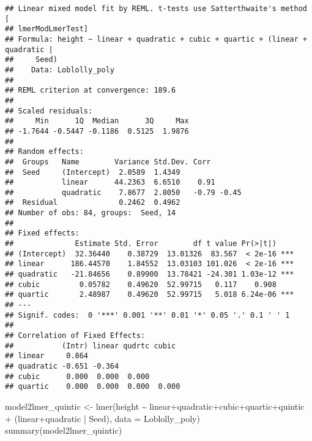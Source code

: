 \documentclass[
]{book}
\newenvironment{Shaded}{\begin{snugshade}}{\end{snugshade}}
\newcommand{\AttributeTok}[1]{\textcolor[rgb]{0.77,0.63,0.00}{#1}}
\newcommand{\FunctionTok}[1]{\textcolor[rgb]{0.00,0.00,0.00}{#1}}
\newcommand{\NormalTok}[1]{#1}
\newcommand{\OtherTok}[1]{\textcolor[rgb]{0.56,0.35,0.01}{#1}}
\newcommand{\SpecialCharTok}[1]{\textcolor[rgb]{0.00,0.00,0.00}{#1}}
\begin{document}
\begin{verbatim}
## Linear mixed model fit by REML. t-tests use Satterthwaite's method [
## lmerModLmerTest]
## Formula: height ~ linear + quadratic + cubic + quartic + (linear + quadratic |  
##     Seed)
##    Data: Loblolly_poly
## 
## REML criterion at convergence: 189.6
## 
## Scaled residuals: 
##     Min      1Q  Median      3Q     Max 
## -1.7644 -0.5447 -0.1186  0.5125  1.9876 
## 
## Random effects:
##  Groups   Name        Variance Std.Dev. Corr       
##  Seed     (Intercept)  2.0589  1.4349              
##           linear      44.2363  6.6510    0.91      
##           quadratic    7.8677  2.8050   -0.79 -0.45
##  Residual              0.2462  0.4962              
## Number of obs: 84, groups:  Seed, 14
## 
## Fixed effects:
##              Estimate Std. Error        df t value Pr(>|t|)    
## (Intercept)  32.36440    0.38729  13.01326  83.567  < 2e-16 ***
## linear      186.44570    1.84552  13.03103 101.026  < 2e-16 ***
## quadratic   -21.84656    0.89900  13.78421 -24.301 1.03e-12 ***
## cubic         0.05782    0.49620  52.99715   0.117    0.908    
## quartic       2.48987    0.49620  52.99715   5.018 6.24e-06 ***
## ---
## Signif. codes:  0 '***' 0.001 '**' 0.01 '*' 0.05 '.' 0.1 ' ' 1
## 
## Correlation of Fixed Effects:
##           (Intr) linear qudrtc cubic 
## linear     0.864                     
## quadratic -0.651 -0.364              
## cubic      0.000  0.000  0.000       
## quartic    0.000  0.000  0.000  0.000
\end{verbatim}

\begin{Shaded}
\begin{Highlighting}[]
\NormalTok{model2lmer\_quintic }\OtherTok{\textless{}{-}} \FunctionTok{lmer}\NormalTok{(height }\SpecialCharTok{\textasciitilde{}}\NormalTok{ linear}\SpecialCharTok{+}\NormalTok{quadratic}\SpecialCharTok{+}\NormalTok{cubic}\SpecialCharTok{+}\NormalTok{quartic}\SpecialCharTok{+}\NormalTok{quintic }\SpecialCharTok{+}\NormalTok{ (linear}\SpecialCharTok{+}\NormalTok{quadratic }\SpecialCharTok{|}\NormalTok{ Seed), }\AttributeTok{data =}\NormalTok{ Loblolly\_poly)}
\FunctionTok{summary}\NormalTok{(model2lmer\_quintic)}
\end{Highlighting}
\end{Shaded}
\end{document}
